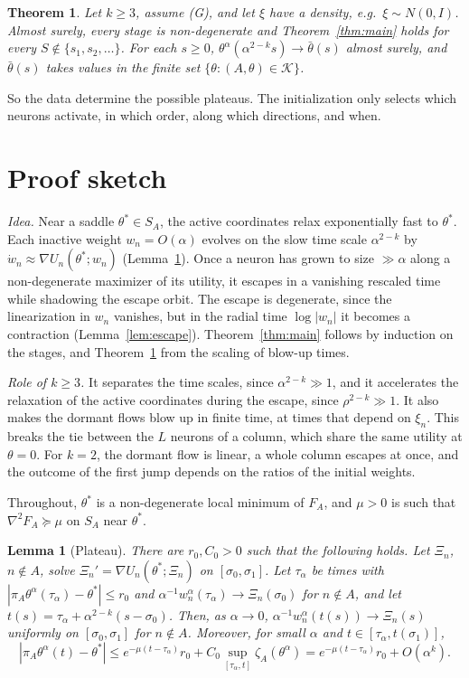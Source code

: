 \documentclass[11pt]{article}
\newtheorem{maintheorem}{Theorem}
\newtheorem{lemma}{Lemma}
\theoremstyle{definition}
\theoremstyle{remark}
\newcommand{\cK}{\mathcal{K}}
\begin{document}
\begin{maintheorem}\label{thm:gaussian}
Let $k\ge3$, assume \textup{(G)}, and let $\xi$ have a density, e.g.\ $\xi\sim N(0,I)$. Almost surely, every stage is non-degenerate and Theorem~\ref{thm:main} holds for every $S\notin\{s_1,s_2,\dots\}$. For each $s\ge0$, $\theta^\alpha(\alpha^{2-k}s)\to\bar\theta(s)$ almost surely, and $\bar\theta(s)$ takes values in the finite set $\{\theta:(A,\theta)\in\cK\}$.
\end{maintheorem}

So the data determine the possible plateaus. The initialization only selects which neurons activate, in which order, along which directions, and when.

\section{Proof sketch}

\emph{Idea.} Near a saddle $\theta^*\in S_A$, the active coordinates relax exponentially fast to $\theta^*$. Each inactive weight $w_n=O(\alpha)$ evolves on the slow time scale $\alpha^{2-k}$ by $\dot w_n\approx\nabla U_n(\theta^*;w_n)$ (Lemma~\ref{lem:plateau}). Once a neuron has grown to size $\gg\alpha$ along a non-degenerate maximizer of its utility, it escapes in a vanishing rescaled time while shadowing the escape orbit. The escape is degenerate, since the linearization in $w_n$ vanishes, but in the radial time $\log|w_n|$ it becomes a contraction (Lemma~\ref{lem:escape}). Theorem~\ref{thm:main} follows by induction on the stages, and Theorem~\ref{thm:gaussian} from the scaling of blow-up times.

\emph{Role of $k\ge3$.} It separates the time scales, since $\alpha^{2-k}\gg1$, and it accelerates the relaxation of the active coordinates during the escape, since $\rho^{2-k}\gg1$. It also makes the dormant flows blow up in finite time, at times that depend on $\xi_n$. This breaks the tie between the $L$ neurons of a column, which share the same utility at $\theta=0$. For $k=2$, the dormant flow is linear, a whole column escapes at once, and the outcome of the first jump depends on the ratios of the initial weights.

Throughout, $\theta^*$ is a non-degenerate local minimum of $F_A$, and $\mu>0$ is such that $\nabla^2F_A\succeq\mu$ on $S_A$ near $\theta^*$.

\begin{lemma}[Plateau]\label{lem:plateau}
There are $r_0,C_0>0$ such that the following holds. Let $\Xi_n$, $n\notin A$, solve $\Xi_n'=\nabla U_n(\theta^*;\Xi_n)$ on $[\sigma_0,\sigma_1]$. Let $\tau_\alpha$ be times with $|\pi_A\theta^\alpha(\tau_\alpha)-\theta^*|\le r_0$ and $\alpha^{-1}w^\alpha_n(\tau_\alpha)\to\Xi_n(\sigma_0)$ for $n\notin A$, and let $t(s)=\tau_\alpha+\alpha^{2-k}(s-\sigma_0)$. Then, as $\alpha\to0$, $\alpha^{-1}w_n^\alpha(t(s))\to\Xi_n(s)$ uniformly on $[\sigma_0,\sigma_1]$ for $n\notin A$. Moreover, for small $\alpha$ and $t\in[\tau_\alpha,t(\sigma_1)]$,
\[
|\pi_A\theta^\alpha(t)-\theta^*|\le e^{-\mu(t-\tau_\alpha)}r_0+C_0\sup_{[\tau_\alpha,t]}\zeta_A(\theta^\alpha)=e^{-\mu(t-\tau_\alpha)}r_0+O(\alpha^k).
\]
\end{lemma}
\end{document}
